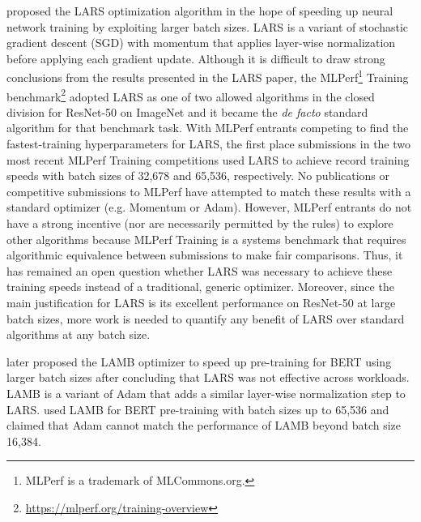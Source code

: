 \documentclass{article}
\begin{document}
\citet{you2017lars} proposed the LARS optimization algorithm in the hope of speeding up neural network training by exploiting larger batch sizes. LARS is a variant of stochastic gradient descent (SGD) with momentum \citep{polyak1964some} that applies layer-wise normalization before applying each gradient update.
Although it is difficult to draw strong conclusions from the results presented in the LARS paper, the MLPerf\footnote{MLPerf is a trademark of MLCommons.org.} Training benchmark\footnote{\url{https://mlperf.org/training-overview}} adopted LARS as one of two allowed algorithms in the closed division for ResNet-50 on ImageNet and it became the \textit{de facto} standard algorithm for that benchmark task.
With MLPerf entrants competing to find the fastest-training hyperparameters for LARS, the first place submissions in the two most recent MLPerf Training competitions used LARS to achieve record training speeds with batch sizes of 32,678 and 65,536, respectively.
No publications or competitive submissions to MLPerf have attempted to match these results with a standard optimizer (e.g. Momentum or Adam).
However, MLPerf entrants do not have a strong incentive (nor are necessarily permitted by the rules) to explore other algorithms because MLPerf Training is a systems benchmark that requires algorithmic equivalence between submissions to make fair comparisons.
Thus, it has remained an open question whether LARS was necessary to achieve these training speeds instead of a traditional, generic optimizer. Moreover, since the main justification for LARS is its excellent performance on ResNet-50 at large batch sizes, more work is needed to quantify any benefit of LARS over standard algorithms at any batch size.

\citet{you2019lamb} later proposed the LAMB optimizer to speed up pre-training for BERT \citep{devlin2018bert} using larger batch sizes after concluding that LARS was not effective across workloads.
LAMB is a variant of Adam \citep{kingma2014adam} that adds a similar layer-wise normalization step to LARS.
\citet{you2019lamb} used LAMB for BERT pre-training with batch sizes up to 65,536 and claimed that Adam cannot match the performance of LAMB beyond batch size 16,384.
\end{document}
